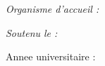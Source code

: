 \begin{titlepage}
\vspace{1.2cm}

\begin{minipage}{0.45\textwidth}
\begin{flushleft} \large
\emph{Organisme d'accueil :}\\
\organisme
\end{flushleft}
\end{minipage}
\begin{minipage}{0.45\textwidth}
\begin{flushright} \large
\emph{Soutenu le :}\\
\datesoutenance
\end{flushright}
\end{minipage}

\vfill

{\large Annee universitaire : \anneeuniv \par}

\end{titlepage}

